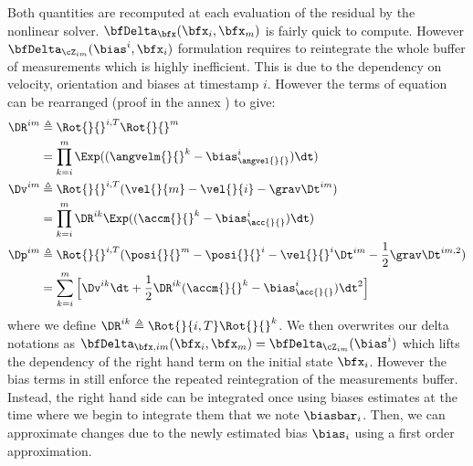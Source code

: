 Both quantities are recomputed at each evaluation of the residual by the nonlinear solver. $\bfDelta_{\bfx}(\bfx_i, \bfx_m)$ is fairly quick to compute.
However $\bfDelta_{\cZ_{im}}(\bias^i, \bfx_i)$ formulation requires to reintegrate the whole buffer of measurements which
is highly inefficient. This is due to the dependency on velocity, orientation and biases at timestamp $i$. However the terms of equation  can 
be rearranged (proof in the annex ) to give:
%
%
\begin{equation}
    \begin{split}
    \DR^{im} &\triangleq  \Rot{}{}^{i,T} \Rot{}{}^{m} \\
             &=  \prod_{k=i}^{m} \Exp((\angvelm{}{}^k - \bias_{\angvel{}{}}^i)\dt) \\
    \Dv^{im} &\triangleq \Rot{}{}^{i,T} (\vel{}{m} - \vel{}{i} - \grav \Dt^{im}) \\
             &= \prod_{k=i}^{m} \DR^{ik} \Exp((\accm{}{}^k - \bias_{\acc{}{}}^i)\dt)  \\
    \Dp^{im} &\triangleq \Rot{}{}^{i,T}(\posi{}{}^m - \posi{}{}^i - \vel{}{}^i \Dt^{im} - \frac{1}{2} \grav \Dt^{im,2}) \\
             &= \sum_{k=i}^{m} \Big[\Dv^{ik}\dt +  \frac{1}{2} \DR^{ik} (\accm{}{}^k - \bias_{\acc{}{}}^i)\dt^2 \Big]
    \end{split}
    \label{eq:IMUPreintij}
\end{equation}
%
where we define $\DR^{ik} \triangleq \Rot{}{i,T} \Rot{}{}^k$.
We then overwrites our delta notations as $\bfDelta_{\bfx,im}(\bfx_i, \bfx_m) = \bfDelta_{\cZ_{im}}(\bias^i)$
which lifts the dependency of the right hand term on the initial state $\bfx_i$. However the bias terms in  still enforce the repeated 
reintegration of the measurements buffer. Instead, the right hand side can be integrated once using biases estimates at the time where we begin to integrate them that
we note $\biasbar_i$. Then, we can approximate changes due to the newly estimated bias $\bias_i$ using a first order approximation.

